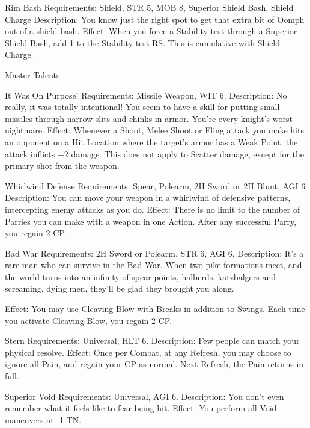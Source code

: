 \documentclass[oneside,11pt,english]{book}
\begin{document}
 

Rim Bash 
Requirements: Shield, STR 5, MOB 8, Superior Shield Bash, Shield Charge 
Description: You know just the right spot to get that extra bit of Oomph out of a shield bash. 
Effect: When you force a Stability test through a Superior Shield Bash, add 1 to the Stability test RS. 
This is cumulative with Shield Charge. 

 

 

Master Talents 

 

It Was On Purpose! 
Requirements: Missile Weapon, WIT 6. 
Description: No really, it was totally intentional! You seem to have a skill for putting small missiles 
through narrow slits and chinks in armor. You’re every knight’s worst nightmare. 
Effect: Whenever a Shoot, Melee Shoot or Fling attack you make hits an opponent on a Hit Location 
where the target’s armor has a Weak Point, the attack inflicts +2 damage. This does not apply to Scatter 
damage, except for the primary shot from the weapon. 

 

Whirlwind Defense 
Requirements: Spear, Polearm, 2H Sword or 2H Blunt, AGI 6 
Description: You can move your weapon in a whirlwind of defensive patterns, intercepting enemy 
attacks as you do. 
Effect: There is no limit to the number of Parries you can make with a weapon in one Action. After any 
successful Parry, you regain 2 CP. 

 

Bad War 
Requirements: 2H Sword or Polearm, STR 6, AGI 6. 
Description: It’s a rare man who can survive in the Bad War. When two pike formations meet, and the 
world turns into an infinity of spear points, halberds, katzbalgers and screaming, dying men, they’ll be 
glad they brought you along. 


Effect: You may use Cleaving Blow with Breaks in addition to Swings. Each time you activate Cleaving 
Blow, you regain 2 CP. 

 

Stern 
Requirements: Universal, HLT 6. 
Description: Few people can match your physical resolve. 
Effect: Once per Combat, at any Refresh, you may choose to ignore all Pain, and regain your CP as 
normal. Next Refresh, the Pain returns in full. 

 

Superior Void 
Requirements: Universal, AGI 6. 
Description: You don’t even remember what it feels like to fear being hit. 
Effect: You perform all Void maneuvers at -1 TN. 
\end{document}
